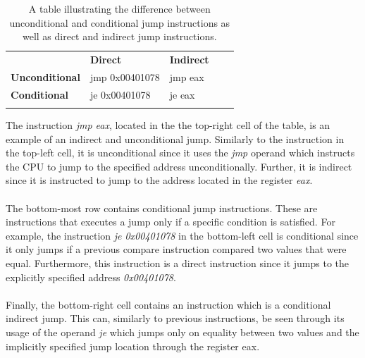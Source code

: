 \documentclass{kththesis}
\begin{document}
\begin{table}[ht]
\centering
\begin{tabular}{lllll}
\cline{1-3}
\multicolumn{1}{|l|}{\textbf{}}              & \multicolumn{1}{l|}{\textbf{Direct}} & \multicolumn{1}{l|}{\textbf{Indirect}} &  &  \\ \cline{1-3}
\multicolumn{1}{|l|}{\textbf{Unconditional}} & \multicolumn{1}{l|}{jmp 0x00401078}    & \multicolumn{1}{l|}{jmp eax}           &  &  \\ \cline{1-3}
\multicolumn{1}{|l|}{\textbf{Conditional}}   & \multicolumn{1}{l|}{je 0x00401078}     & \multicolumn{1}{l|}{je eax}            &  &  \\ \cline{1-3}
                                             &                                      &                                        &  &
\end{tabular}
\caption{A table illustrating the difference between unconditional and conditional jump instructions as well as direct and indirect jump instructions.}
\label{tab:jumps}
\end{table}
\noindent
The instruction \textit{jmp eax}, located in the the top-right cell of the table, is an example of an indirect and unconditional jump. Similarly to the instruction in the top-left cell, it is unconditional since it uses the \textit{jmp} operand which instructs the CPU to jump to the specified address unconditionally. Further, it is indirect since it is instructed to jump to the address located in the register \textit{eax}.
\\ \\
The bottom-most row contains conditional jump instructions. These are instructions that executes a jump only if a specific condition is satisfied. For example, the instruction \textit{je 0x00401078} in the bottom-left cell is conditional since it only jumps if a previous compare instruction compared two values that were equal. Furthermore, this instruction is a direct instruction since it jumps to the explicitly specified address \textit{0x00401078}.
\\ \\
Finally, the bottom-right cell contains an instruction which is a conditional indirect jump. This can, similarly to previous instructions, be seen through its usage of the operand \textit{je} which jumps only on equality between two values and the implicitly specified jump location through the register eax.
\\ \\
\end{document}
